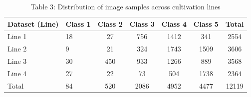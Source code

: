 \begin{table}[ht]
\centering
\caption{Table 3: Distribution of image samples across cultivation lines}
\begin{tabular}{llccccc}
\hline
Dataset (Line) & Class 1 & Class 2 & Class 3 & Class 4 & Class 5 & Total \\
\hline
Line 1 & 18 & 27 & 756 & 1412 & 341 & 2554 \\
Line 2 & 9 & 21 & 324 & 1743 & 1509 & 3606 \\
Line 3 & 30 & 450 & 933 & 1266 & 889 & 3568 \\
Line 4 & 27 & 22 & 73 & 504 & 1738 & 2364 \\
Total & 84 & 520 & 2086 & 4952 & 4477 & 12119 \\
\hline
\end{tabular}
\end{table}
